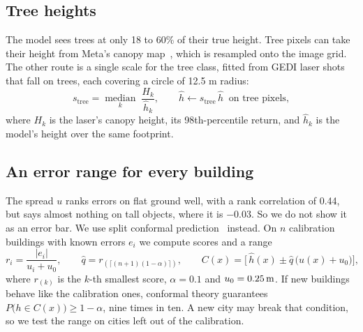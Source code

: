 \documentclass[11pt,a4paper]{article}
\newcommand{\m}{\ifmmode\,\mathrm{m}\else\,m\fi}
\begin{document}
\subsection{Tree heights}
The model sees trees at only 18 to 60\% of their true height. Tree pixels can take their height from Meta's canopy map~\cite{tolan2024canopy}, which is resampled onto the image grid. The other route is a single scale for the tree class, fitted from GEDI laser shots~\cite{dubayah2020gedi} that fall on trees, each covering a circle of 12.5\m{} radius:
\begin{equation}
s_{\mathrm{tree}} = \operatorname*{median}_{k}\; \frac{H_k}{\hat h_k}, \qquad \hat h \leftarrow s_{\mathrm{tree}}\,\hat h \ \text{ on tree pixels},
\label{eq:tree}
\end{equation}
where $H_k$ is the laser's canopy height, its 98th-percentile return, and $\hat h_k$ is the model's height over the same footprint.

\subsection{An error range for every building}
\label{sec:conformal}
The spread $u$ ranks errors on flat ground well, with a rank correlation of 0.44, but says almost nothing on tall objects, where it is $-0.03$. So we do not show it as an error bar. We use split conformal prediction~\cite{lei2018conformal} instead. On $n$ calibration buildings with known errors $e_i$ we compute scores and a range
\begin{equation}
r_i = \frac{|e_i|}{u_i+u_0},\qquad
\hat q = r_{(\lceil (n+1)(1-\alpha)\rceil)},\qquad
C(x) = \bigl[\,\hat h(x) \pm \hat q\,\bigl(u(x)+u_0\bigr)\bigr],
\label{eq:conformal}
\end{equation}
where $r_{(k)}$ is the $k$-th smallest score, $\alpha = 0.1$ and $u_0 = 0.25\m$. If new buildings behave like the calibration ones, conformal theory guarantees $P\bigl(h \in C(x)\bigr) \ge 1-\alpha$, nine times in ten. A new city may break that condition, so we test the range on cities left out of the calibration.
\end{document}
